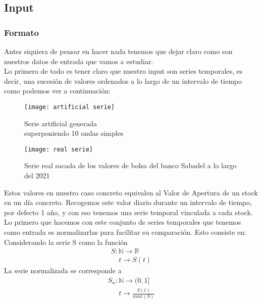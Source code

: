 \documentclass[12pt,a4paper]{article}
\begin{document}
		\subsection{Input}
			\subsubsection{Formato}
		Antes siquiera de pensar en hacer nada tenemos que dejar claro como son nuestros datos de entrada que vamos a estudiar.\\
		Lo primero de todo es tener claro que nuestro input son series temporales, es decir, una sucesión de valores ordenados a lo largo de un intervalo de tiempo como podemos ver a continuación:\\
\begin{figure}[H]
\centering
\begin{minipage}{.5\textwidth}
  \centering
  \texttt{[image: artificial serie]}
  \caption{Serie artificial generada \\superponiendo 10 ondas simples\\ \phantom{filler}}
  \label{fig:test1}
\end{minipage}%
\begin{minipage}{.5\textwidth}
  \centering
  \texttt{[image: real serie]}
  \caption{Serie real sacada de los valores de bolsa del banco Sabadel a lo largo del 2021}
  \label{fig:test2}
\end{minipage}
\end{figure}
		Estos valores en nuestro caso concreto equivalen al Valor de Apertura de un stock en un día concreto. Recogemos este valor diario durante un intervalo de tiempo, por defecto 1 año, y con eso tenemos una serie temporal vinculada a cada stock.\\
		Lo primero que hacemos con este conjunto de series temporales que tenemos como entrada es normalizarlas para facilitar su comparación. Esto consiste en:\\
		Considerando la serie S como la función
		\[\begin{array}{lcc}
		S:\mathbb{N}\rightarrow\mathbb{R}\\
 		\ \ \ \ \ t\rightarrow S(t)
		\end{array}\]
		La serie normalizada se corresponde a
		\[\begin{array}{lcc}
		S_n:\mathbb{N}\rightarrow(0,1]\\
 		\ \ \ \ \ \ \ t\rightarrow \frac{S(t)}{max(S)}
		\end{array}\]
\end{document}
